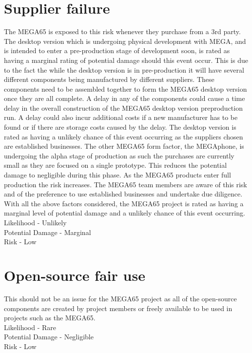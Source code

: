 \section{Supplier failure}
The MEGA65 is exposed to this risk whenever they purchase from a 3rd party. The desktop version which is undergoing physical development with MEGA, and is intended to enter a pre-production stage of development soon, is rated as having a marginal rating of potential damage should this event occur. This is due to the fact the while the desktop version is in pre-production it will have several different components being manufactured by different suppliers. These components need to be assembled together to form the MEGA65 desktop version once they are all complete. A delay in any of the components could cause a time delay in the overall construction of the MEGA65 desktop version preproduction run. A delay could also incur additional costs if a new manufacturer has to be found or if there are storage costs caused by the delay. The desktop version is rated as having a unlikely chance of this event occurring as the suppliers chosen are established businesses. The other MEGA65 form factor, the MEGAphone, is undergoing the alpha stage of production as such the purchases are currently small as they are focused on a single prototype. This reduces the potential damage to negligible during this phase. As the MEGA65 products enter full production the risk increases. The MEGA65 team members are aware of this risk and of the preference to use established businesses and undertake due diligence. With all the above factors considered, the MEGA65 project is rated as having a marginal level of potential damage and a unlikely chance of this event occurring. \\

Likelihood - Unlikely \\
Potential Damage - Marginal \\
Risk - Low \\

\section{Open-source fair use}
This should not be an issue for the MEGA65 project as all of the open-source components are created by project members or freely available to be used in projects such as the MEGA65. \\

Likelihood - Rare \\
Potential Damage - Negligible \\
Risk - Low \\


